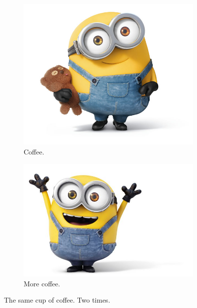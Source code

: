 \documentclass[a4paper]{article}
\begin{document}
\begin{figure}[h!]
  \centering
  \begin{subfigure}[b]{0.4\linewidth}
    \includegraphics[width=\linewidth]{bob1.jpg}
    \caption{Coffee.}
  \end{subfigure}
  \begin{subfigure}[b]{0.4\linewidth}
    \includegraphics[width=\linewidth]{bob2.jpg}
    \caption{More coffee.}
  \end{subfigure}
  \caption{The same cup of coffee. Two times.}
  \label{fig:coffee}
\end{figure}
\end{document}
